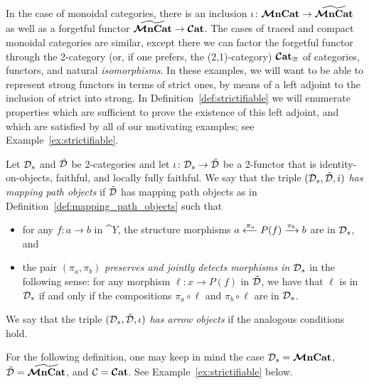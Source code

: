 \documentclass[11pt,oneside,article]{memoir}
\begin{document}
In the case of monoidal categories, there is an inclusion $\iota\colon\bm{\mathcal{M}}\mathbf{nCat}\to\widetilde{\bm{\mathcal{M}}\mathbf{nCat}}$ as
well as a forgetful functor $\widetilde{\bm{\mathcal{M}}\mathbf{nCat}}\to\bm{\mathcal{C}}\mathbf{at}$. The cases of traced and compact monoidal
categories are similar, except there we can factor the forgetful functor through the 2-category (or,
if one prefers, the (2,1)-category) $\bm{\mathcal{C}}\mathbf{at}_{\cong}$ of categories, functors, and natural
\emph{isomorphisms}. In these examples, we will want to be able to represent strong functors in
terms of strict ones, by means of a left adjoint to the inclusion of strict into strong. In
Definition~\ref{def:strictifiable} we will enumerate properties which are sufficient to prove the
existence of this left adjoint, and which are satisfied by all of our motivating examples; see
Example~\ref{ex:strictifiable}.

\begin{definition}
      \label{def:preserve_jdetect_strictness}
   Let $\mathcal{D}_s$ and $\tilde{\mathcal{D}}$ be 2-categories and let $\iota\colon\mathcal{D}_s\to\tilde{\mathcal{D}}$ be a
   2-functor that is identity-on-objects, faithful, and locally fully faithful. We say that the
   triple $(\mathcal{D}_s,\tilde{\mathcal{D}},i)$ \emph{has mapping path objects} if $\tilde{\mathcal{D}}$ has mapping path
   objects as in Definition~\ref{def:mapping_path_objects} such that
   \begin{itemize}
      \item for any $f\colon a\to b$ in $\cat{Y}$, the structure morphisms
         $a\xleftarrow{\pi_a}P(f)\xrightarrow{\pi_b}b$ are in $\mathcal{D}_s$, and
      \item the pair $(\pi_a,\pi_b)$ \emph{preserves and jointly detects morphisms in $\mathcal{D}_s$} in
         the following sense: for any morphism $\ell\colon x\to P(f)$ in $\tilde{\mathcal{D}}$, we have that
         $\ell$ is in $\mathcal{D}_s$ if and only if the compositions $\pi_a\circ\ell$ and
         $\pi_b\circ\ell$ are in $\mathcal{D}_s$.
   \end{itemize}
   We say that the triple $(\mathcal{D}_s,\tilde{\mathcal{D}},\iota)$ \emph{has arrow objects} if the analogous
   conditions hold.
\end{definition}

For the following definition, one may keep in mind the case $\mathcal{D}_s=\bm{\mathcal{M}}\mathbf{nCat}$,
$\tilde{\mathcal{D}}=\widetilde{\bm{\mathcal{M}}\mathbf{nCat}}$, and $\mathcal{C}=\bm{\mathcal{C}}\mathbf{at}$. See Example~\ref{ex:strictifiable} below.
\end{document}
